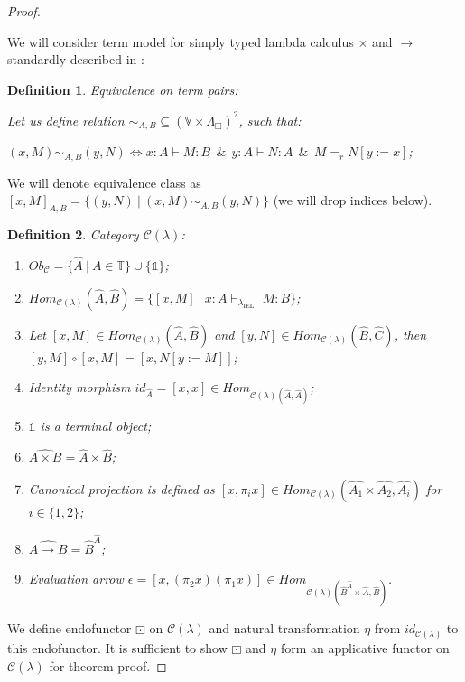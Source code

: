 \documentclass[a4paper]{article}
\newtheorem{defin}{Definition}
\begin{document}
\begin{proof}

$ $

We will consider term model for simply typed lambda calculus $\times$ and $\to$ standardly described in \cite{LambekScott}:

\begin{defin} Equivalence on term pairs:
  $ $

  Let us define relation $\sim_{A, B} \subseteq (\mathbb{V} \times \Lambda_{\Box})^2$, such that:

  $(x, M) \sim_{A, B} (y, N) \Leftrightarrow x : A \vdash M : B \:\: \& \:\: y : A \vdash N : A \:\: \& \:\: M =_r N [y := x]$;
\end{defin}

We will denote equivalence class as $[x, M]_{A, B} = \{ (y, N) \: | \: (x, M) \sim_{A, B} (y, N) \}$ (we will drop indices below).


\begin{defin} Category $\mathcal{C}(\lambda)$:
\begin{enumerate}
  \item $Ob_{\mathcal{C}} = \{ \hat{A} \: | \: A \in \mathbb{T} \} \cup \{ \mathds{1} \}$;
  \item $Hom_{\mathcal{C}(\lambda)}(\hat{A},\hat{B}) = \{ [x, M] \: | \: x : A \vdash_{\lambda_{\text{IEL}^{-}}} M : B \}$;
  \item Let $[x, M] \in Hom_{\mathcal{C}(\lambda)}(\hat{A},\hat{B})$ and $[y,N] \in Hom_{\mathcal{C}(\lambda)}(\hat{B},\hat{C})$, then $[y,M] \circ [x, M] = [x, N [y := M]]$;
  \item Identity morphism $id_{\hat{A}} = [x,x] \in Hom_{\mathcal{C}(\lambda)(\hat{A}, \hat{A})}$;
  \item $\mathds{1}$ is a terminal object;
  \item $\widehat{A \times B} = \hat{A} \times \hat{B}$;
  \item Canonical projection is defined as $[x, \pi_i x] \in Hom_{\mathcal{C}(\lambda)}(\hat{A_1} \times \hat{A_2},\hat{A_i})$ for $i \in \{ 1, 2 \}$;
  \item $\widehat{A \to B} = \hat{B}^{\hat{A}}$;
  \item Evaluation arrow $\epsilon = [x, (\pi_2 x) (\pi_1 x)] \in Hom_{\mathcal{C}(\lambda)(\hat{B}^{\hat{A}} \times \hat{A}, \hat{B})}$.
\end{enumerate}
\end{defin}

We define endofunctor $\boxdot$ on $\mathcal{C}(\lambda)$ and natural transformation $\eta$ from $id_{\mathcal{C}(\lambda)}$ to this endofunctor.
It is sufficient to show $\boxdot$ and $\eta$ form an applicative functor on $\mathcal{C}(\lambda)$ for theorem proof.


\end{proof}
\end{document}

